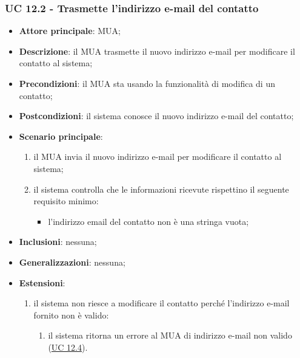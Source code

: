     \subsubsection{UC 12.2 - Trasmette l'indirizzo e-mail del contatto} \label{sec:UC12.2}
    \begin{itemize}
        \item \textbf{Attore principale}: MUA;
        \item \textbf{Descrizione}: il MUA trasmette il nuovo indirizzo e-mail per modificare il contatto al sistema;
        \item \textbf{Precondizioni}: il MUA sta usando la funzionalità di modifica di un contatto;
        \item \textbf{Postcondizioni}: il sistema conosce il nuovo indirizzo e-mail del contatto;
        \item \textbf{Scenario principale}:
            \begin{enumerate}
                \item il MUA invia il nuovo indirizzo e-mail per modificare il contatto al sistema;
                \item il sistema controlla che le informazioni ricevute rispettino il seguente requisito minimo:
                    \begin{itemize}
                        \item l'indirizzo email del contatto non è una stringa vuota;
                    \end{itemize}
            \end{enumerate}
        \item \textbf{Inclusioni}: nessuna;
        \item \textbf{Generalizzazioni}: nessuna;
        \item \textbf{Estensioni}:
            \begin{enumerate}[label=\alph*.]
                \item il sistema non riesce a modificare il contatto perché l'indirizzo e-mail fornito non è valido:
                \begin{enumerate}[label=\arabic*.]
                    \item il sistema ritorna un errore al MUA di indirizzo e-mail non valido (\hyperref[sec:UC12.4]{UC 12.4}).
                \end{enumerate}
            \end{enumerate}
    \end{itemize}




